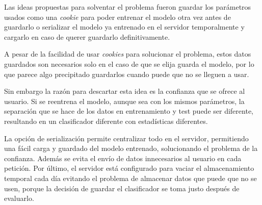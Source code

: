 Las ideas propuestas para solventar el problema fueron guardar los parámetros
usados como una \textit{cookie} para poder entrenar el modelo otra vez antes de
guardarlo o serializar el modelo ya entrenado en el servidor temporalmente y
cargarlo en caso de querer guardarlo definitivamente.

A pesar de la facilidad de usar \textit{cookies} para solucionar el problema,
estos datos guardados son necesarios solo en el caso de que se elija guarda el
modelo, por lo que parece algo precipitado guardarlos cuando puede que no se
lleguen a usar.

Sin embargo la razón para descartar esta idea es la confianza que se ofrece al
usuario. Si se reentrena el modelo, aunque sea con los mismos parámetros, la
separación que se hace de los datos en entrenamiento y test puede ser diferente,
resultando en un clasificador diferente con estadísticas diferentes.

La opción de serialización permite centralizar todo en el servidor, permitiendo
una fácil carga y guardado del modelo entrenado, solucionando el problema de la
confianza. Además se evita el envío de datos innecesarios al usuario en cada
petición. Por último, el servidor está configurado para vaciar el almacenamiento
temporal cada día evitando el problema de almacenar datos que puede que no se
usen, porque la decisión de guardar el clasificador se toma justo después de
evaluarlo. 
